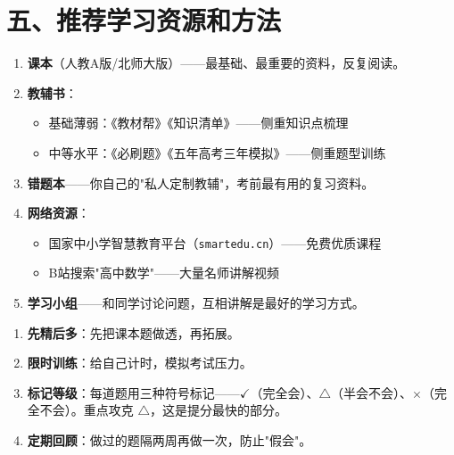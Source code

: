 \documentclass[12pt, a4paper]{ctexart}
\begin{document}
\section*{\textcolor{mainblue}{五、推荐学习资源和方法}}

\begin{knowledgebox}[学习资源推荐]
\begin{enumerate}[leftmargin=2.5em]
  \item \textbf{课本}（人教A版/北师大版）——最基础、最重要的资料，反复阅读。
  \item \textbf{教辅书}：
  \begin{itemize}
    \item 基础薄弱：《教材帮》《知识清单》——侧重知识点梳理
    \item 中等水平：《必刷题》《五年高考三年模拟》——侧重题型训练
  \end{itemize}
  \item \textbf{错题本}——你自己的"私人定制教辅"，考前最有用的复习资料。
  \item \textbf{网络资源}：
  \begin{itemize}
    \item 国家中小学智慧教育平台（\texttt{smartedu.cn}）——免费优质课程
    \item B站搜索"高中数学"——大量名师讲解视频
  \end{itemize}
  \item \textbf{学习小组}——和同学讨论问题，互相讲解是最好的学习方式。
\end{enumerate}
\end{knowledgebox}

\begin{tipbox}[关于"刷题"的正确姿势]
\begin{enumerate}[leftmargin=2.5em]
  \item \textbf{先精后多}：先把课本题做透，再拓展。
  \item \textbf{限时训练}：给自己计时，模拟考试压力。
  \item \textbf{标记等级}：每道题用三种符号标记——$\checkmark$（完全会）、$\triangle$（半会不会）、$\times$（完全不会）。重点攻克 $\triangle$，这是提分最快的部分。
  \item \textbf{定期回顾}：做过的题隔两周再做一次，防止"假会"。
\end{enumerate}
\end{tipbox}
\end{document}
